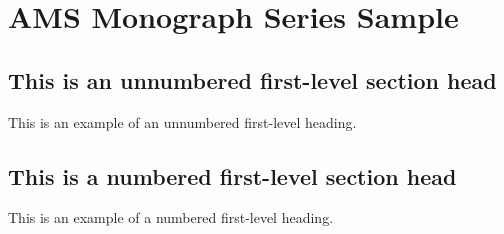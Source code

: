 \chapter{AMS Monograph Series Sample}

\section*{This is an unnumbered first-level section head}  %
This is an example of an unnumbered first-level heading.


\section{This is a numbered first-level section head}  %
This is an example of a numbered first-level heading.


\endinput  %

